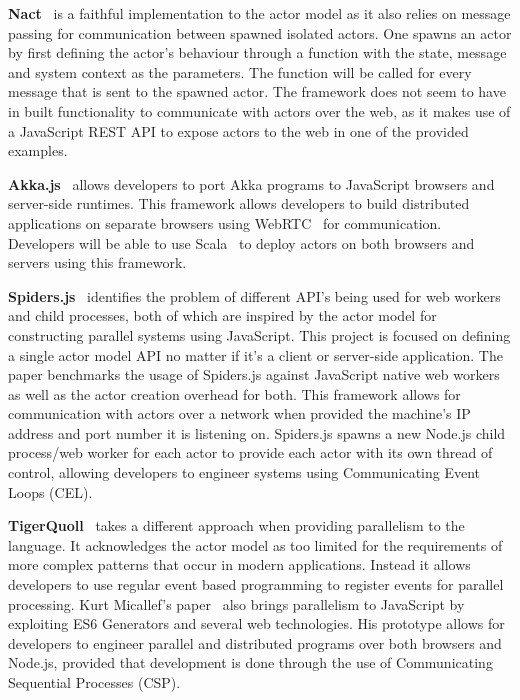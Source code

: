\documentclass[oneside]{um-fict}
\begin{document}
\textbf{Nact}~\cite{nact} is a faithful implementation to the actor model as it also relies on message passing for communication between spawned isolated actors. One spawns an actor by first defining the actor's behaviour through a function with the state, message and system context as the parameters. The function will be called for every message that is sent to the spawned actor. The framework does not seem to have in built functionality to communicate with actors over the web, as it makes use of a JavaScript REST API to expose actors to the web in one of the provided examples.

\textbf{Akka.js}~\cite{stivan2015akka} allows developers to port Akka programs to JavaScript browsers and server-side runtimes. This framework allows developers to build distributed applications on separate browsers using WebRTC~\cite{webrtc} for communication. Developers will be able to use Scala~\cite{scala} to deploy actors on both browsers and servers using this framework.

\textbf{Spiders.js}~\cite{spidersjs} identifies the problem of different API's being used for web workers and child processes, both of which are inspired by the actor model for constructing parallel systems using JavaScript. This project is focused on defining a single actor model API no matter if it's a client or server-side application. The paper benchmarks the usage of Spiders.js against JavaScript native web workers as well as the actor creation overhead for both. This framework allows for communication with actors over a network when provided the machine's IP address and port number it is listening on. Spiders.js spawns a new Node.js child process/web worker for each actor to provide each actor with its own thread of control, allowing developers to engineer systems using Communicating Event Loops (CEL).

\textbf{TigerQuoll}~\cite{tigerquoll} takes a different approach when providing parallelism to the language. It acknowledges the actor model as too limited for the requirements of more complex patterns that occur in modern applications. Instead it allows developers to use regular event based programming to register events for parallel processing. Kurt Micallef's paper~\cite{kurt} also brings parallelism to JavaScript by exploiting ES6 Generators and several web technologies. His prototype allows for developers to engineer parallel and distributed programs over both browsers and Node.js, provided that development is done through the use of Communicating Sequential Processes (CSP).
\end{document}
